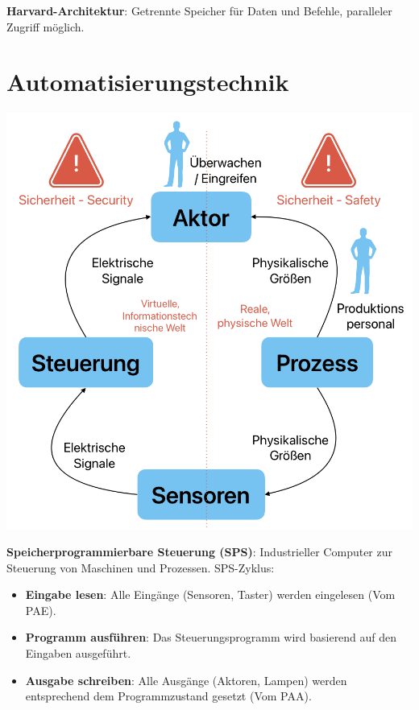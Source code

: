 \documentclass[9pt, a3paper, landscape]{article}
\newcommand{\algo}[1]{\textbf{\textcolor{blue!60!black}{#1}}}
\newcommand{\datastruct}[1]{\textbf{\textcolor{red!60!black}{#1}}}
\begin{document}
\begin{multicols*}{4}
\begin{itemize}
\textbf{Harvard-Architektur}: Getrennte Speicher für Daten und Befehle, paralleler Zugriff möglich.


\section{Automatisierungstechnik}
  
\begin{center}
    \includegraphics[width=0.8\linewidth]{assets/ATC.png}
\end{center}

\datastruct{Speicherprogrammierbare Steuerung (SPS)}: Industrieller Computer zur Steuerung von Maschinen und Prozessen. SPS-Zyklus:
\begin{itemize}
    \item \algo{Eingabe lesen}: Alle Eingänge (Sensoren, Taster) werden eingelesen (Vom PAE).
    \item \algo{Programm ausführen}: Das Steuerungsprogramm wird basierend auf den Eingaben ausgeführt.
    \item \algo{Ausgabe schreiben}: Alle Ausgänge (Aktoren, Lampen) werden entsprechend dem Programmzustand gesetzt (Vom PAA).
\end{itemize}


\end{itemize}
\end{multicols*}
\end{document}
